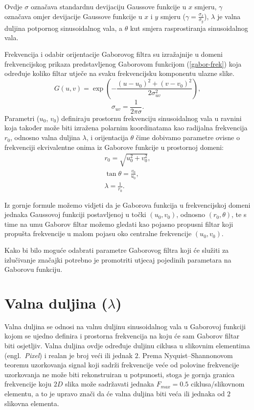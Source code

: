 \documentclass[12pt,a4paper]{ReportAA}
\newcommand{\engl}[1]{(engl.~\emph{#1})}
\begin{document}
Ovdje $\sigma$ označava standardnu devijaciju Gaussove funkcije u $x$ smjeru,
$\gamma$ označava omjer devijacije Gaussove funkcije u $x$ i $y$ smjeru ($\gamma =
\frac{\sigma_x}{\sigma_y}$), $\lambda$ je valna duljina potpornog sinusoidalnog
vala, a $\theta$ kut smjera rasprostiranja sinusoidalnog vala.

Frekvencija i odabir orijentacije Gaborovog filtra su izražajnije u
domeni frekvencijskog prikaza predstavljenog Gaborovom funkcijom (\ref{gabor-frek}) koja
određuje koliko filtar utječe na svaku frekvencijsku komponentu ulazne slike.
\begin{equation}
G(u,v) = \exp \left ( - \frac{(u-u_0)^2 + (v-v_0)^2}{2\sigma^2_{uv}}\right ),
\label{gabor-frek}
\end{equation}
\begin{equation}
\sigma_{uv} = \frac{1}{2\pi \sigma}.
\end{equation}
Parametri ($u_0$, $v_0$) definiraju prostornu frekvenciju sinusoidalnog vala u
ravnini koja također može biti izražena polarnim koordinatama kao radijalna
frekvencija $r_0$, odnosno valna duljina $\lambda$, i orijentacija $\theta$ čime
dobivamo parametre ovisne o frekvenciji ekvivalentne onima iz Gaborove funkcije u prostornoj
domeni:
\begin{eqnarray}
r_0 = \sqrt{u_0^2 + v_0^2}, \\
\tan \theta = \frac{v_0}{u_0}, \\
\lambda = \frac{1}{r_0}.
\end{eqnarray}

Iz gornje formule možemo vidjeti da je Gaborova funkcija u frekvencijskoj domeni
jednaka Gaussovoj funkciji postavljenoj u točki $(u_0, v_0)$, odnosno $(r_0,
\theta)$, te s time na umu Gaborov filtar možemo gledati kao pojasno propusni
filtar koji propušta frekvencije u malom pojasu oko centralne frekvencije $(u_0,
v_0)$.

Kako bi bilo moguće odabrati parametre Gaborovog filtra koji će služiti
za izlučivanje značajki potrebno je promotriti utjecaj pojedinih parametara na
Gaborovu funkciju.

\section{Valna duljina ($\lambda$)}
Valna duljina se odnosi na valnu duljinu sinusoidalnog vala u Gaborovoj funkciji
kojom se ujedno definira i prostorna frekvencija na koju će sam Gaborov filtar
biti osjetljiv. Valna duljina ovdje određuje duljinu ciklusa u slikovnim
elementima \engl{Pixel} i realan je broj veći ili jednak $2$. Prema
Nyquist--Shannonovom teoremu uzorkovanja signal koji sadrži frekvencije veće od
polovine frekvencije uzorkovanja ne može biti rekonstruiran u potpunosti, stoga
je gornja granica frekvencije koju $2D$ slika može sadržavati jednaka $F_{max} =
0.5$ ciklusa/slikovnom elementu, a to je upravo znači da će valna duljina
biti veća ili jednaka od $2$ slikovna elementa.
\end{document}

